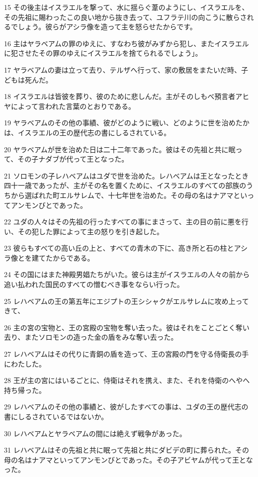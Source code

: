 \par 15 その後主はイスラエルを撃って、水に揺らぐ葦のようにし、イスラエルを、その先祖に賜わったこの良い地から抜き去って、ユフラテ川の向こうに散らされるでしょう。彼らがアシラ像を造って主を怒らせたからです。
\par 16 主はヤラベアムの罪のゆえに、すなわち彼がみずから犯し、またイスラエルに犯させたその罪のゆえにイスラエルを捨てられるでしょう」。
\par 17 ヤラベアムの妻は立って去り、テルザへ行って、家の敷居をまたいだ時、子どもは死んだ。
\par 18 イスラエルは皆彼を葬り、彼のために悲しんだ。主がそのしもべ預言者アヒヤによって言われた言葉のとおりである。
\par 19 ヤラベアムのその他の事績、彼がどのように戦い、どのように世を治めたかは、イスラエルの王の歴代志の書にしるされている。
\par 20 ヤラベアムが世を治めた日は二十二年であった。彼はその先祖と共に眠って、その子ナダブが代って王となった。
\par 21 ソロモンの子レハベアムはユダで世を治めた。レハベアムは王となったとき四十一歳であったが、主がその名を置くために、イスラエルのすべての部族のうちから選ばれた町エルサレムで、十七年世を治めた。その母の名はナアマといってアンモンびとであった。
\par 22 ユダの人々はその先祖の行ったすべての事にまさって、主の目の前に悪を行い、その犯した罪によって主の怒りを引き起した。
\par 23 彼らもすべての高い丘の上と、すべての青木の下に、高き所と石の柱とアシラ像とを建てたからである。
\par 24 その国にはまた神殿男娼たちがいた。彼らは主がイスラエルの人々の前から追い払われた国民のすべての憎むべき事をならい行った。
\par 25 レハベアムの王の第五年にエジプトの王シシャクがエルサレムに攻め上ってきて、
\par 26 主の宮の宝物と、王の宮殿の宝物を奪い去った。彼はそれをことごとく奪い去り、またソロモンの造った金の盾をみな奪い去った。
\par 27 レハベアムはその代りに青銅の盾を造って、王の宮殿の門を守る侍衛長の手にわたした。
\par 28 王が主の宮にはいるごとに、侍衛はそれを携え、また、それを侍衛のへやへ持ち帰った。
\par 29 レハベアムのその他の事績と、彼がしたすべての事は、ユダの王の歴代志の書にしるされているではないか。
\par 30 レハベアムとヤラベアムの間には絶えず戦争があった。
\par 31 レハベアムはその先祖と共に眠って先祖と共にダビデの町に葬られた。その母の名はナアマといってアンモンびとであった。その子アビヤムが代って王となった。

